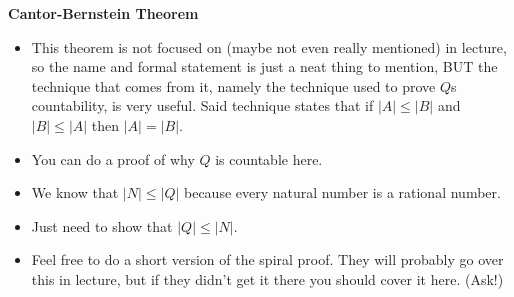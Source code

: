 \item \textbf{Cantor-Bernstein Theorem}
\begin{itemize}
\item This theorem is not focused on (maybe not even really mentioned) 
in lecture, so the name and formal statement is just a neat thing to 
mention, BUT the technique that comes from it, namely the technique used 
to prove $Q$s countability, is very useful. Said technique states that 
if $|A| \leq |B|$ and $|B| \leq |A|$ then $|A| = |B|$.
\item You can do a proof of why $Q$ is countable here.
\item We know that $|N| \leq |Q|$ because every natural number is a rational number.
\item Just need to show that $|Q| \leq |N|$.
\item Feel free to do a short version of the spiral proof. They will 
probably go over this in lecture, but if they didn’t get it there you 
should cover it here. (Ask!)
\end{itemize}